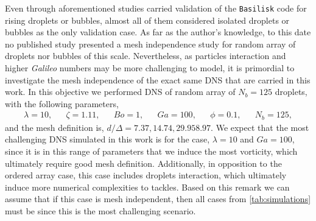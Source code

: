 Even through aforementioned studies carried validation of the \texttt{Basilisk} code for rising droplets or bubbles, almost all of them considered isolated droplets or bubbles as the only validation case. 
As far as the author's knowledge, to this date no published study presented a mesh independence study for random array of droplets nor bubbles of this scale. 
Nevertheless, as particles interaction and higher \textit{Galileo} numbers may be more challenging to model, it is primordial to investigate the mesh independence of the exact same DNS that are carried in this work. 
In this objective we performed DNS of random array of $N_b=125$ droplets, with the following parameters,
\begin{align*}
    \lambda = 10,
    && \zeta = 1.11,
    && Bo = 1,
    && Ga = 100,
    && \phi = 0.1,
    && N_b =125,
\end{align*}
and the mesh definition is, $d/\Delta = 7.37, 14.74, 29.9 58.97$. 
We expect that the most challenging DNS simulated in this work is for the case, $\lambda = 10$ and $Ga = 100$, since it is in this range of parameters that we induce the most vorticity, which ultimately require good mesh definition. 
Additionally, in opposition to the ordered array case, this case includes droplets interaction, which ultimately induce more numerical complexities to tackles. 
Based on this remark we can assume that if this case is mesh independent, then all cases from \ref{tab:simulations} must be since this is the most challenging scenario.   

